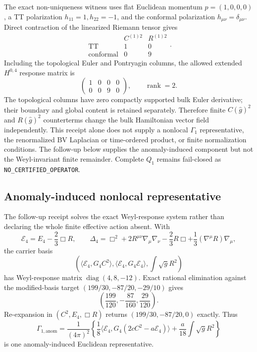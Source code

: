 \documentclass[11pt]{article}
\theoremstyle{definition}
\theoremstyle{remark}
\begin{document}
The exact non-uniqueness witness uses flat Euclidean momentum
$p=(1,0,0,0)$, a TT polarization $h_{11}=1,h_{22}=-1$, and the conformal
polarization $h_{\mu\nu}=\delta_{\mu\nu}$.  Direct contraction of the
linearized Riemann tensor gives
\[
 \begin{array}{c|cc}
 & C^{(1)2}&R^{(1)2}\\ \hline
 \mathrm{TT}&1&0\\
 \mathrm{conformal}&0&9
 \end{array}.
\]
Including the topological Euler and Pontryagin columns, the allowed extended
$H^{0,4}$ response matrix is
\[
 \begin{pmatrix}1&0&0&0\\0&0&9&0\end{pmatrix},
 \qquad \operatorname{rank}=2.
\]
The topological columns have zero compactly supported bulk Euler derivative;
their boundary and global content is retained separately.  Therefore finite
$C(\widehat g)^2$ and $R(\widehat g)^2$ counterterms change the bulk
Hamiltonian vector field independently.  This receipt alone does not supply
a nonlocal $\Gamma_1$ representative, the renormalized BV Laplacian or
time-ordered product, or finite normalization conditions.  The follow-up
below supplies the anomaly-induced component but not the Weyl-invariant
finite remainder.  Complete $Q_1$ remains fail-closed as
\texttt{NO\_CERTIFIED\_OPERATOR}.

\subsection{Anomaly-induced nonlocal representative}

The follow-up receipt solves the exact Weyl-response system rather than
declaring the whole finite effective action absent.  With
\[
 \mathcal E_4=E_4-\frac23\Box R,
 \qquad
 \Delta_4=\Box^2+2R^{\mu\nu}\nabla_\mu\nabla_\nu
 -\frac23R\Box+\frac13(\nabla^\mu R)\nabla_\mu,
\]
the carrier basis
\[
 \left(
 \langle\mathcal E_4,G_4C^2\rangle,
 \langle\mathcal E_4,G_4\mathcal E_4\rangle,
 \int\sqrt g R^2
 \right)
\]
has Weyl-response matrix $\operatorname{diag}(4,8,-12)$.  Exact rational
elimination against the modified-basis target
$(199/30,-87/20,-29/10)$ gives
\[
 \left(\frac{199}{120},-\frac{87}{160},\frac{29}{120}\right).
\]
Re-expansion in $(C^2,E_4,\Box R)$ returns
$(199/30,-87/20,0)$ exactly.  Thus
\[
 \Gamma_{1,\mathrm{anom}}
 =\frac1{(4\pi)^2}\left\{
 \frac18\langle\mathcal E_4,G_4(2cC^2-a\mathcal E_4)\rangle
 +\frac{a}{18}\int\sqrt g R^2
 \right\}
\]
is one anomaly-induced Euclidean representative.
\end{document}
